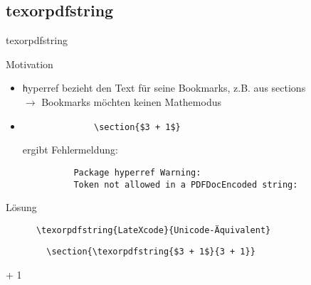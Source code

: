\subsection{texorpdfstring}

\begin{frame}[fragile]{texorpdfstring}

  \begin{block}{Motivation}
    \begin{itemize}
      \item {\texttt hyperref} bezieht den Text für seine Bookmarks, z.B. aus sections \\ $\rightarrow$ Bookmarks möchten keinen Mathemodus
      \item \begin{lstlisting}
              \section{$3 + 1$}
            \end{lstlisting}
      ergibt Fehlermeldung:
        \begin{lstlisting}
          Package hyperref Warning:
          Token not allowed in a PDFDocEncoded string:
        \end{lstlisting}
    \end{itemize}
  \end{block}
  \begin{block}{Lösung}
    \begin{lstlisting}
      \texorpdfstring{LateXcode}{Unicode-Äquivalent}
    \end{lstlisting}
   \end{block}
    \begin{CodeExample}{0.49}
      \begin{lstlisting}
        \section{\texorpdfstring{$3 + 1$}{3 + 1}}
      \end{lstlisting}
       + 1
    \end{CodeExample}
\end{frame}
